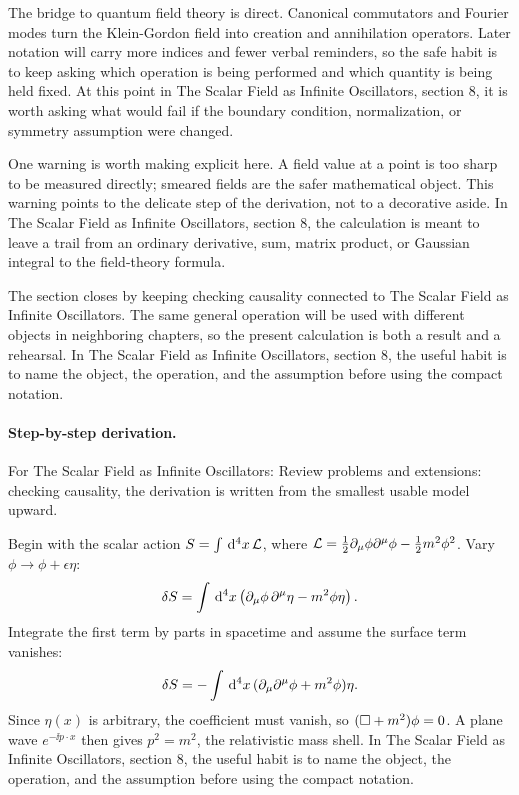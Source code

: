 The bridge to quantum field theory is direct.  Canonical commutators and Fourier modes turn the Klein-Gordon field into creation and annihilation operators.  Later notation will carry more indices and fewer verbal reminders, so the safe habit is to keep asking which operation is being performed and which quantity is being held fixed.  At this point in The Scalar Field as Infinite Oscillators, section 8, it is worth asking what would fail if the boundary condition, normalization, or symmetry assumption were changed.

One warning is worth making explicit here.  A field value at a point is too sharp to be measured directly; smeared fields are the safer mathematical object.  This warning points to the delicate step of the derivation, not to a decorative aside.  In The Scalar Field as Infinite Oscillators, section 8, the calculation is meant to leave a trail from an ordinary derivative, sum, matrix product, or Gaussian integral to the field-theory formula.

The section closes by keeping checking causality connected to The Scalar Field as Infinite Oscillators.  The same general operation will be used with different objects in neighboring chapters, so the present calculation is both a result and a rehearsal.  In The Scalar Field as Infinite Oscillators, section 8, the useful habit is to name the object, the operation, and the assumption before using the compact notation.



\paragraph{Step-by-step derivation.}

For The Scalar Field as Infinite Oscillators: Review problems and extensions: checking causality, the derivation is written from the smallest usable model upward.

Begin with the scalar action \(S=\int\,\mathrm d^4x\,\mathcal L\), where \(\mathcal L=\frac12\partial_\mu\phi\partial^\mu\phi-\frac12m^2\phi^2\).  Vary \(\phi\to\phi+\epsilon\eta\):
\[
  \delta S=\int\,\mathrm d^4x\left(\partial_\mu\phi\,\partial^\mu\eta-m^2\phi\eta\right).
\]
Integrate the first term by parts in spacetime and assume the surface term vanishes:
\[
  \delta S=-\int\,\mathrm d^4x\,(\partial_\mu\partial^\mu\phi+m^2\phi)\eta.
\]
Since \(\eta(x)\) is arbitrary, the coefficient must vanish, so \((\Box+m^2)\phi=0\).  A plane wave \(e^{-\ii p\cdot x}\) then gives \(p^2=m^2\), the relativistic mass shell.  In The Scalar Field as Infinite Oscillators, section 8, the useful habit is to name the object, the operation, and the assumption before using the compact notation.

